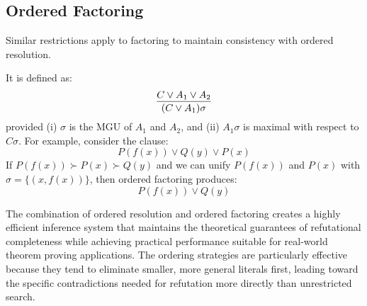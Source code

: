 \subsection{Ordered Factoring}\label{subsec:ordered-factoring}

Similar restrictions apply to factoring to maintain consistency with ordered resolution.

It is defined as:
\begin{equation}
  \infer{(C \lor A_1)\sigma}{C \lor A_1 \lor A_2}
\end{equation}
\indent provided (i) \(\sigma\) is the MGU of \(A_1\) and \(A_2\), and (ii) \(A_1\sigma\) is maximal with respect to \(C\sigma\).
For example, consider the clause:
\[P(f(x)) \lor Q(y) \lor P(x)\]
If \(P(f(x)) \succ P(x) \succ Q(y)\) and we can unify \(P(f(x))\) and \(P(x)\) with \(\sigma = \{(x , f(x))\}\), then ordered factoring produces:
\[P(f(x)) \lor Q(y)\]

The combination of ordered resolution and ordered factoring creates a highly efficient inference system that maintains the theoretical guarantees of refutational completeness while achieving practical performance suitable for real-world theorem proving applications.
The ordering strategies are particularly effective because they tend to eliminate smaller, more general literals first, leading toward the specific contradictions needed for refutation more directly than unrestricted search.



